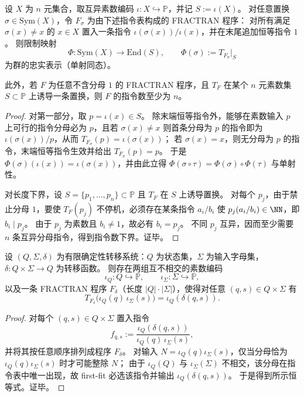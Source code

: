 \begin{theorem}\label{thm:pom-fractran-permutation-embedding-length}
设 \(X\) 为 \(n\) 元集合，取互异素数编码 \(\iota:X\hookrightarrow\mathbb P\)，并记 \(S:=\iota(X)\)。
对任意置换 \(\sigma\in\mathrm{Sym}(X)\)，令 \(F_\sigma\) 为由下述指令表构成的 FRACTRAN 程序：
对所有满足 \(\sigma(x)\neq x\) 的 \(x\in X\) 置入一条指令 \(\iota(\sigma(x))/\iota(x)\)，并在末尾追加恒等指令 \(1\)。
则限制映射
\[
\Phi:\mathrm{Sym}(X)\longrightarrow \mathrm{End}(S),
\qquad
\Phi(\sigma):=T_{F_\sigma}\big|_{S}
\]
为群的忠实表示（单射同态）。
\par
此外，若 \(F\) 为任意不含分母 \(1\) 的 FRACTRAN 程序，且 \(T_F\) 在某个 \(n\) 元素数集 \(S\subset\mathbb P\) 上诱导一条置换，则 \(F\) 的指令数至少为 \(n\)。
\end{theorem}
\begin{proof}
对第一部分，取 \(p=\iota(x)\in S\)。
除末端恒等指令外，能够在素数输入 \(p\) 上可行的指令分母必为 \(p\)，且若 \(\sigma(x)\neq x\) 则首条分母为 \(p\) 的指令即为 \(\iota(\sigma(x))/p\)，从而 \(T_{F_\sigma}(p)=\iota(\sigma(x))\)；
若 \(\sigma(x)=x\)，则无分母为 \(p\) 的指令，末端恒等指令生效并给出 \(T_{F_\sigma}(p)=p\)。
于是 \(\Phi(\sigma)(\iota(x))=\iota(\sigma(x))\)，并由此立得 \(\Phi(\sigma\circ\tau)=\Phi(\sigma)\circ\Phi(\tau)\) 与单射性。
\par
对长度下界，设 \(S=\{p_1,\dots,p_n\}\subset\mathbb P\) 且 \(T_F\) 在 \(S\) 上诱导置换。
对每个 \(p_j\)，由于禁止分母 \(1\)，要使 \(T_F(p_j)\) 不停机，必须存在某条指令 \(a_i/b_i\) 使 \(p_j(a_i/b_i)\in\NN\)，即 \(b_i\mid p_j\)。
由于 \(p_j\) 为素数且 \(b_i\neq 1\)，故必有 \(b_i=p_j\)。
不同 \(p_j\) 互异，因而至少需要 \(n\) 条互异分母指令，得到指令数下界。证毕。
\end{proof}

\begin{theorem}[有限确定性转移系统的二素数分母编译]\label{thm:pom-fractran-two-prime-denominator-dfa-compile}
设 \((Q,\Sigma,\delta)\) 为有限确定性转移系统：\(Q\) 为状态集，\(\Sigma\) 为输入字母集，\(\delta:Q\times\Sigma\to Q\) 为转移函数。
则存在两组互不相交的素数编码
\[
\iota_Q:Q\hookrightarrow\mathbb P,
\qquad
\iota_\Sigma:\Sigma\hookrightarrow\mathbb P,
\]
以及一条 FRACTRAN 程序 \(F_\delta\)（长度 \(|Q|\cdot|\Sigma|\)），使得对任意 \((q,s)\in Q\times\Sigma\) 有
\[
T_{F_\delta}\bigl(\iota_Q(q)\,\iota_\Sigma(s)\bigr)=\iota_Q(\delta(q,s)).
\]
\end{theorem}
\begin{proof}
对每个 \((q,s)\in Q\times\Sigma\) 置入指令
\[
f_{q,s}:=\frac{\iota_Q(\delta(q,s))}{\iota_Q(q)\,\iota_\Sigma(s)},
\]
并将其按任意顺序排列成程序 \(F_\delta\)。
对输入 \(N=\iota_Q(q)\iota_\Sigma(s)\)，仅当分母恰为 \(\iota_Q(q)\iota_\Sigma(s)\) 时才可能整除 \(N\)；
由于 \(\iota_Q(Q)\) 与 \(\iota_\Sigma(\Sigma)\) 不相交，该分母在指令表中唯一出现，故 first-fit 必选该指令并输出 \(\iota_Q(\delta(q,s))\)。
于是得到所示恒等式。证毕。
\end{proof}

